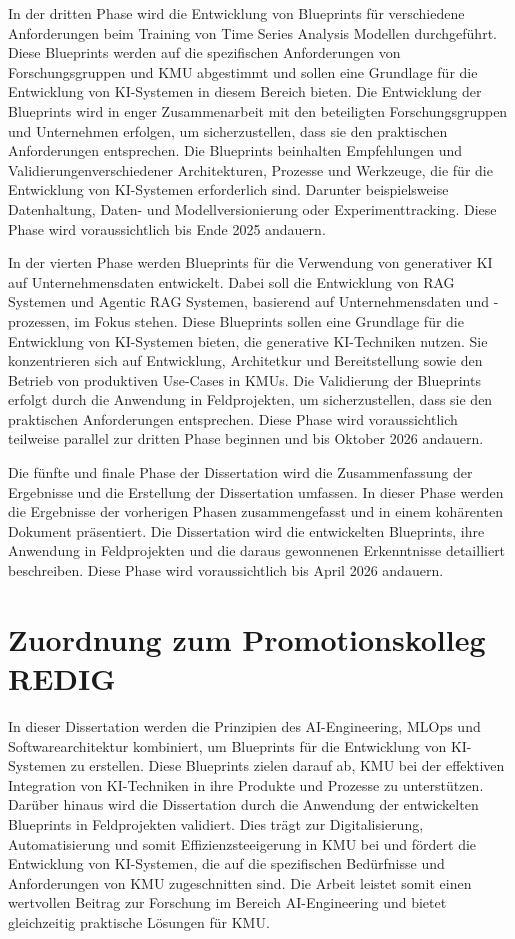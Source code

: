 \documentclass[11pt,a4paper,pointlessnumbers]{scrartcl}
\theoremstyle{break}
\numberwithin{equation}{section}
\begin{document}
In der dritten Phase wird die Entwicklung von Blueprints für verschiedene Anforderungen beim Training von Time Series Analysis Modellen durchgeführt. Diese Blueprints werden auf die spezifischen Anforderungen von Forschungsgruppen und KMU abgestimmt und sollen eine Grundlage für die Entwicklung von KI-Systemen in diesem Bereich bieten. Die Entwicklung der Blueprints wird in enger Zusammenarbeit mit den beteiligten Forschungsgruppen und Unternehmen erfolgen, um sicherzustellen, dass sie den praktischen Anforderungen entsprechen. Die Blueprints beinhalten Empfehlungen und Validierungenverschiedener Architekturen, Prozesse und Werkzeuge, die für die Entwicklung von KI-Systemen erforderlich sind. Darunter beispielsweise Datenhaltung, Daten- und Modellversionierung oder Experimenttracking. Diese Phase wird voraussichtlich bis Ende 2025 andauern.

In der vierten Phase werden Blueprints für die Verwendung von generativer KI auf Unternehmensdaten entwickelt. Dabei soll die Entwicklung von RAG Systemen und Agentic RAG Systemen, basierend auf Unternehmensdaten und -prozessen, im Fokus stehen. Diese Blueprints sollen eine Grundlage für die Entwicklung von KI-Systemen bieten, die generative KI-Techniken nutzen. Sie konzentrieren sich auf Entwicklung, Architetkur und Bereitstellung sowie den Betrieb von produktiven Use-Cases in KMUs. Die Validierung der Blueprints erfolgt durch die Anwendung in Feldprojekten, um sicherzustellen, dass sie den praktischen Anforderungen entsprechen. Diese Phase wird voraussichtlich teilweise parallel zur dritten Phase beginnen und bis Oktober 2026 andauern.

Die fünfte und finale Phase der Dissertation wird die Zusammenfassung der Ergebnisse und die Erstellung der Dissertation umfassen. In dieser Phase werden die Ergebnisse der vorherigen Phasen zusammengefasst und in einem kohärenten Dokument präsentiert. Die Dissertation wird die entwickelten Blueprints, ihre Anwendung in Feldprojekten und die daraus gewonnenen Erkenntnisse detailliert beschreiben. Diese Phase wird voraussichtlich bis April 2026 andauern.


\section{Zuordnung zum Promotionskolleg REDIG}
In dieser Dissertation werden die Prinzipien des AI-Engineering, MLOps und Softwarearchitektur kombiniert, um Blueprints für die Entwicklung von KI-Systemen zu erstellen. Diese Blueprints zielen darauf ab, KMU bei der effektiven Integration von KI-Techniken in ihre Produkte und Prozesse zu unterstützen. Darüber hinaus wird die Dissertation durch die Anwendung der entwickelten Blueprints in Feldprojekten validiert. Dies trägt zur Digitalisierung, Automatisierung und somit Effizienzsteeigerung in KMU bei und fördert die Entwicklung von KI-Systemen, die auf die spezifischen Bedürfnisse und Anforderungen von KMU zugeschnitten sind. Die Arbeit leistet somit einen wertvollen Beitrag zur Forschung im Bereich AI-Engineering und bietet gleichzeitig praktische Lösungen für KMU.

\newpage

\end{document}
